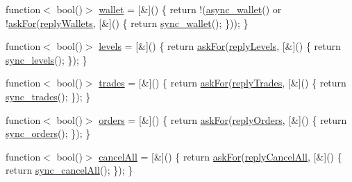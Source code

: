 \begin{DoxyCompactItemize}
\item 
function$<$ bool()$>$ \hyperlink{class_k_1_1_gw_a2381015e1bae39f4cfd8e158bec8161a}{wallet} = \mbox{[}\&\mbox{]}() \{ return !(\hyperlink{class_k_1_1_gw_a69bd12a2ef6f58b5a44c15b3801c2ef2}{async\+\_\+wallet}() or !\hyperlink{class_k_1_1_gw_af6748577cac6d6171379036bcd243228}{ask\+For}(\hyperlink{class_k_1_1_gw_af1978cbd97d41a4197e481dc8fdfa5eb}{reply\+Wallets}, \mbox{[}\&\mbox{]}() \{ return \hyperlink{class_k_1_1_gw_a45b0afcbe68c422db35af9b503831be5}{sync\+\_\+wallet}(); \})); \}
\item 
function$<$ bool()$>$ \hyperlink{class_k_1_1_gw_a167ae09c2d39a1aee89c080bf58c7fb3}{levels} = \mbox{[}\&\mbox{]}() \{ return \hyperlink{class_k_1_1_gw_af6748577cac6d6171379036bcd243228}{ask\+For}(\hyperlink{class_k_1_1_gw_a37ee3b756d9b6633e81ff28125314fab}{reply\+Levels}, \mbox{[}\&\mbox{]}() \{ return \hyperlink{class_k_1_1_gw_ac20ee1cedc4725a39815f28d36470fa1}{sync\+\_\+levels}(); \}); \}
\item 
function$<$ bool()$>$ \hyperlink{class_k_1_1_gw_a2e04da03fb9d2f9179864a70244aedb9}{trades} = \mbox{[}\&\mbox{]}() \{ return \hyperlink{class_k_1_1_gw_af6748577cac6d6171379036bcd243228}{ask\+For}(\hyperlink{class_k_1_1_gw_a3648d850c8042fbb808b77b0ebec8087}{reply\+Trades}, \mbox{[}\&\mbox{]}() \{ return \hyperlink{class_k_1_1_gw_a41fa6e2cd171072202fa1e44fbd780c5}{sync\+\_\+trades}(); \}); \}
\item 
function$<$ bool()$>$ \hyperlink{class_k_1_1_gw_ab56786d35b5f78826316091dfb92b300}{orders} = \mbox{[}\&\mbox{]}() \{ return \hyperlink{class_k_1_1_gw_af6748577cac6d6171379036bcd243228}{ask\+For}(\hyperlink{class_k_1_1_gw_ab6cf63a19336c99e031b44359e68814f}{reply\+Orders}, \mbox{[}\&\mbox{]}() \{ return \hyperlink{class_k_1_1_gw_a96bb7b05334000c911a75894711853c4}{sync\+\_\+orders}(); \}); \}
\item 
function$<$ bool()$>$ \hyperlink{class_k_1_1_gw_a14d117d8e7284953667f53db89f1700c}{cancel\+All} = \mbox{[}\&\mbox{]}() \{ return \hyperlink{class_k_1_1_gw_af6748577cac6d6171379036bcd243228}{ask\+For}(\hyperlink{class_k_1_1_gw_a02a0f0472ebae5925916a1d6661f8375}{reply\+Cancel\+All}, \mbox{[}\&\mbox{]}() \{ return \hyperlink{class_k_1_1_gw_aae707e552babec2a6f663f1c79745206}{sync\+\_\+cancel\+All}(); \}); \}
\end{DoxyCompactItemize}
